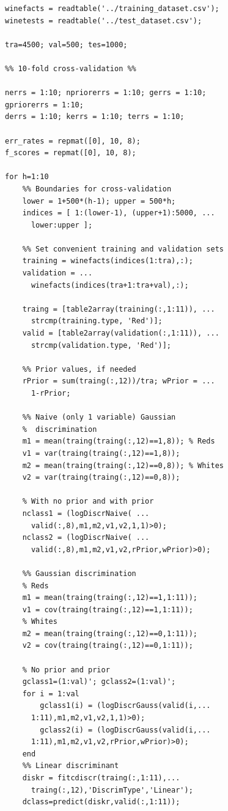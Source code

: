 \documentclass[twoside]{article}
\begin{document}
\begin{multicols}{2}
{\footnotesize

\begin{verbatim}
winefacts = readtable('../training_dataset.csv');
winetests = readtable('../test_dataset.csv');

tra=4500; val=500; tes=1000;

%% 10-fold cross-validation %%

nerrs = 1:10; npriorerrs = 1:10; gerrs = 1:10; 
gpriorerrs = 1:10;
derrs = 1:10; kerrs = 1:10; terrs = 1:10;

err_rates = repmat([0], 10, 8); 
f_scores = repmat([0], 10, 8); 

for h=1:10
    %% Boundaries for cross-validation
    lower = 1+500*(h-1); upper = 500*h;
    indices = [ 1:(lower-1), (upper+1):5000, ...
      lower:upper ];

    %% Set convenient training and validation sets
    training = winefacts(indices(1:tra),:);
    validation = ...
      winefacts(indices(tra+1:tra+val),:);

    traing = [table2array(training(:,1:11)), ... 
      strcmp(training.type, 'Red')];
    valid = [table2array(validation(:,1:11)), ... 
      strcmp(validation.type, 'Red')];

    %% Prior values, if needed
    rPrior = sum(traing(:,12))/tra; wPrior = ...
      1-rPrior;

    %% Naive (only 1 variable) Gaussian 
    %  discrimination
    m1 = mean(traing(traing(:,12)==1,8)); % Reds
    v1 = var(traing(traing(:,12)==1,8));
    m2 = mean(traing(traing(:,12)==0,8)); % Whites
    v2 = var(traing(traing(:,12)==0,8));

    % With no prior and with prior
    nclass1 = (logDiscrNaive( ...
      valid(:,8),m1,m2,v1,v2,1,1)>0);
    nclass2 = (logDiscrNaive( ...
      valid(:,8),m1,m2,v1,v2,rPrior,wPrior)>0);

    %% Gaussian discrimination
    % Reds
    m1 = mean(traing(traing(:,12)==1,1:11)); 
    v1 = cov(traing(traing(:,12)==1,1:11));
    % Whites
    m2 = mean(traing(traing(:,12)==0,1:11)); 
    v2 = cov(traing(traing(:,12)==0,1:11));

    % No prior and prior
    gclass1=(1:val)'; gclass2=(1:val)'; 
    for i = 1:val
        gclass1(i) = (logDiscrGauss(valid(i,...
	  1:11),m1,m2,v1,v2,1,1)>0);
        gclass2(i) = (logDiscrGauss(valid(i,...
	  1:11),m1,m2,v1,v2,rPrior,wPrior)>0);
    end 
    %% Linear discriminant
    diskr = fitcdiscr(traing(:,1:11),...
      traing(:,12),'DiscrimType','Linear');
    dclass=predict(diskr,valid(:,1:11));


\end{verbatim}}
\end{multicols}
\end{document}
